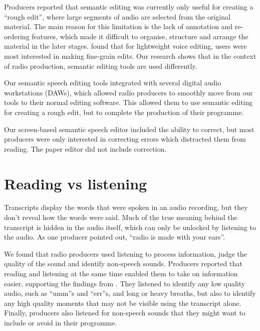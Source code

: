 Producers reported that semantic editing was currently only useful for creating a ``rough edit'', where large segments
of audio are selected from the original material. The main reason for this limitation is the lack of annotation and
re-ordering features, which made it difficult to organise, structure and arrange the material in the later stages.
\citet{Sivaraman2016} found that for lightweight voice editing, users were most interested in making fine-grain edits.
Our research shows that in the context of radio production, semantic editing tools are used differently.

Our semantic speech editing tools integrated with several digital audio workstations (DAWs),
which allowed radio producers to smoothly move from our tools to their normal editing software.
This allowed them to use semantic editing for creating a rough edit, but to complete the production of their programme.


Our screen-based semantic speech editor included the ability to correct, but most producers were only interested in
correcting errors which distracted them from reading. The paper editor did not include correction.


\section{Reading vs listening}

Transcripts display the words that were spoken in an audio recording, but they don't reveal how the words were said.
Much of the true meaning behind the transcript is hidden in the audio itself, which can only be unlocked by listening
to the audio.  As one producer pointed out, ``radio is made with your ears''.

We found that radio producers used listening to process information, judge the quality of the sound and identify
non-speech sounds.  Producers reported that reading and listening at the same time enabled them to take on information
easier, supporting the findings from \citet{Vemuri2004}.  They listened to identify any low quality audio, such as
``umm''s and ``err''s, and long or heavy breaths, but also to identify any high quality moments that may not be visible
using the transcript alone.  Finally, producers also listened for non-speech sounds that they might want to include or
avoid in their programme.

